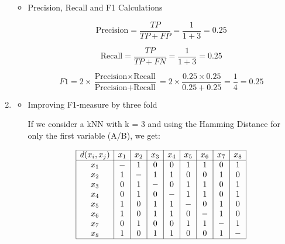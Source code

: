 \documentclass[12pt]{article}
\begin{document}
\begin{enumerate}[leftmargin=\labelsep, label=\textbf{\arabic*.)}]
\begin{itemize}
              \item Precision, Recall and F1 Calculations

                    \[
                        \text{Precision} = \frac{TP}{TP + FP} = \frac{1}{1 + 3} = 0.25
                    \]

                    \[
                        \text{Recall} = \frac{TP}{TP + FN} = \frac{1}{1 + 3} = 0.25
                    \]

                    \[
                        F1 = 2 \times \frac{\text{Precision} \times \text{Recall}}{\text{Precision} + \text{Recall}} = 2 \times \frac{0.25 \times 0.25}{0.25 + 0.25} = \frac{1}{4} = 0.25
                    \]

          \end{itemize}
    \item \begin{itemize}
              \item Improving F1-measure by three fold

                    If we consider a kNN with k = 3 and using the Hamming Distance for only the first variable (A/B), we get:

                    \vspace{1.5em}

                    \begin{minipage}{1\textwidth}
                        \begin{center}
                            \[\begin{array}{|c|c|c|c|c|c|c|c|c|}
                                    \hline
                                    d(x_i, x_j) & x_1 & x_2 & x_3 & x_4 & x_5 & x_6 & x_7 & x_8 \\
                                    \hline
                                    x_1         & -   & 1   & 0   & 0   & 1   & 1   & 0   & 1   \\
                                    x_2         & 1   & -   & 1   & 1   & 0   & 0   & 1   & 0   \\
                                    x_3         & 0   & 1   & -   & 0   & 1   & 1   & 0   & 1   \\
                                    x_4         & 0   & 1   & 0   & -   & 1   & 1   & 0   & 1   \\
                                    x_5         & 1   & 0   & 1   & 1   & -   & 0   & 1   & 0   \\
                                    x_6         & 1   & 0   & 1   & 1   & 0   & -   & 1   & 0   \\
                                    x_7         & 0   & 1   & 0   & 0   & 1   & 1   & -   & 1   \\
                                    x_8         & 1   & 0   & 1   & 1   & 0   & 0   & 1   & -   \\
                                    \hline
                                \end{array}\]
                        \end{center}
                    \end{minipage}


\end{itemize}
\end{enumerate}
\end{document}

